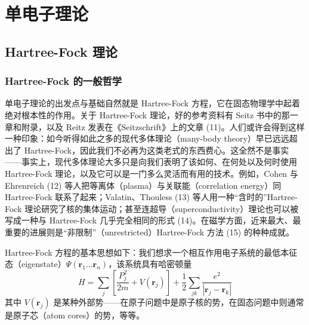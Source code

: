 
\chapter{单电子理论}

\section{Hartree-Fock 理论}

\subsection{Hartree-Fock 的一般哲学}

单电子理论的出发点与基础自然就是 Hartree-Fock 方程，它在固态物理学中起着绝对根本性的作用。关于 Hartree-Fock 理论，好的参考资料有 Seitz 书中的那一章和附录，以及 Reitz 发表在《Seitzschrift》上的文章 (11)。人们或许会得到这样一种印象：如今听得如此之多的现代多体理论（many-body theory）早已远远超出了 Hartree-Fock，因此我们不必再为这类老式的东西费心。这全然不是事实——事实上，现代多体理论大多只是向我们表明了该如何、在何处以及何时使用 Hartree-Fock 理论，以及它可以是一门多么灵活而有用的技术。例如，Cohen 与 Ehrenreich (12) 等人把等离体（plasma）与关联能（correlation energy）同 Hartree-Fock 联系了起来；Valatin、Thouless (13) 等人用一种“含时的”Hartree-Fock 理论研究了核的集体运动；甚至连超导（superconductivity）理论也可以被写成一种与 Hartree-Fock 几乎完全相同的形式 (14)。在磁学方面，近来最大、最重要的进展则是“非限制”（unrestricted）Hartree-Fock 方法 (15) 的种种成就。

Hartree-Fock 方程的基本思想如下：我们想求一个相互作用电子系统的最低本征态（eigenstate）$\Psi(\mathbf{r}_1\ldots\mathbf{r}_n)$，该系统具有哈密顿量
\begin{equation*}
H=\sum_j\left[\frac{P_j^2}{2m}+V(\mathbf{r}_j)\right]+\frac{1}{2}\sum_{jk}\frac{e^2}{|\mathbf{r}_j-\mathbf{r}_k|}
\end{equation*}
其中 $V(\mathbf{r}_j)$ 是某种外部势——在原子问题中是原子核的势，在固态问题中则通常是原子芯（atom cores）的势，等等。

